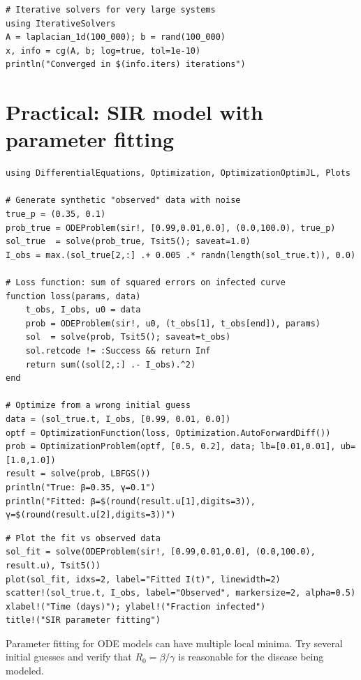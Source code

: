 \begin{verbatim}
# Iterative solvers for very large systems
using IterativeSolvers
A = laplacian_1d(100_000); b = rand(100_000)
x, info = cg(A, b; log=true, tol=1e-10)
println("Converged in $(info.iters) iterations")
\end{verbatim}

\section{Practical: SIR model with parameter fitting}

\begin{verbatim}
using DifferentialEquations, Optimization, OptimizationOptimJL, Plots

# Generate synthetic "observed" data with noise
true_p = (0.35, 0.1)
prob_true = ODEProblem(sir!, [0.99,0.01,0.0], (0.0,100.0), true_p)
sol_true  = solve(prob_true, Tsit5(); saveat=1.0)
I_obs = max.(sol_true[2,:] .+ 0.005 .* randn(length(sol_true.t)), 0.0)

# Loss function: sum of squared errors on infected curve
function loss(params, data)
    t_obs, I_obs, u0 = data
    prob = ODEProblem(sir!, u0, (t_obs[1], t_obs[end]), params)
    sol  = solve(prob, Tsit5(); saveat=t_obs)
    sol.retcode != :Success && return Inf
    return sum((sol[2,:] .- I_obs).^2)
end

# Optimize from a wrong initial guess
data = (sol_true.t, I_obs, [0.99, 0.01, 0.0])
optf = OptimizationFunction(loss, Optimization.AutoForwardDiff())
prob = OptimizationProblem(optf, [0.5, 0.2], data; lb=[0.01,0.01], ub=[1.0,1.0])
result = solve(prob, LBFGS())
println("True: β=0.35, γ=0.1")
println("Fitted: β=$(round(result.u[1],digits=3)), γ=$(round(result.u[2],digits=3))")
\end{verbatim}

\begin{verbatim}
# Plot the fit vs observed data
sol_fit = solve(ODEProblem(sir!, [0.99,0.01,0.0], (0.0,100.0), result.u), Tsit5())
plot(sol_fit, idxs=2, label="Fitted I(t)", linewidth=2)
scatter!(sol_true.t, I_obs, label="Observed", markersize=2, alpha=0.5)
xlabel!("Time (days)"); ylabel!("Fraction infected")
title!("SIR parameter fitting")
\end{verbatim}

\begin{warningbox}
Parameter fitting for ODE models can have multiple local minima. Try several initial guesses and verify that $R_0 = \beta/\gamma$ is reasonable for the disease being modeled.
\end{warningbox}

